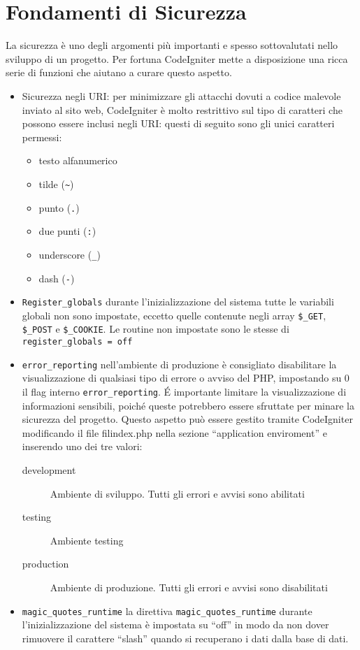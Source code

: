 \section{Fondamenti di Sicurezza}
\label{cap:sicurezza}

La sicurezza è uno degli argomenti più importanti e spesso sottovalutati nello sviluppo di un progetto. Per fortuna CodeIgniter mette a disposizione una ricca serie di funzioni che aiutano a curare questo aspetto.

\begin{itemize}
\item Sicurezza negli URI: per minimizzare gli attacchi dovuti a codice malevole inviato al sito web, CodeIgniter è molto restrittivo sul tipo di caratteri che possono essere inclusi negli URI: questi di seguito sono gli unici caratteri permessi:

\begin{itemize}
\item testo alfanumerico
\item tilde (\verb|~|)
\item punto (\verb|.|)
\item due punti (\verb|:|)
\item underscore (\verb|_|)
\item dash (\verb|-|)
\end{itemize}

\item \verb|Register_globals| durante l'inizializzazione del sistema tutte le variabili globali non sono impostate, eccetto quelle contenute negli array \verb|$_GET|, \verb|$_POST| e \verb|$_COOKIE|. Le routine non impostate sono le stesse di \verb|register_globals = off|

\item \verb|error_reporting| nell'ambiente di produzione è consigliato disabilitare la visualizzazione di qualsiasi tipo di errore o avviso del \ac{PHP}, impostando su 0 il flag interno  \verb|error_reporting|. \'E importante limitare la visualizzazione di informazioni sensibili, poiché queste potrebbero essere sfruttate per minare la sicurezza del progetto. Questo aspetto può essere gestito tramite CodeIgniter modificando il file fil{index.php} nella sezione ``application enviroment'' e inserendo uno dei tre valori:

\begin{description}
\item [development] Ambiente di sviluppo. Tutti gli errori e avvisi sono abilitati
\item [testing] Ambiente testing
\item [production] Ambiente di produzione. Tutti gli errori e avvisi sono disabilitati
\end{description}

\item \verb|magic_quotes_runtime| la direttiva \verb|magic_quotes_runtime| durante l'inizializzazione del sistema è impostata su ``off'' in modo da non dover rimuovere il carattere ``slash'' quando si recuperano i dati dalla base di dati.
\end{itemize}

